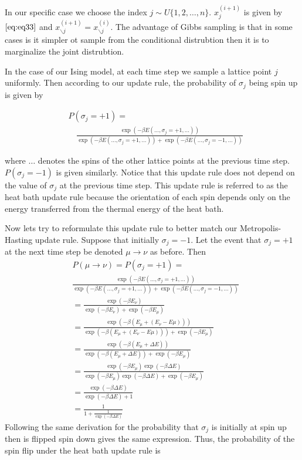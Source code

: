 \documentclass{article}
\begin{document}
In our specific case we choose the index $j \sim U\{1,2,\ldots, n\}$. $x_j^{(i+1)}$ is given by $\ref{eq:eq33}$ and 
$x_{\backslash j}^{(i+1)} = x_{\backslash j}^{(i)}$. The advantage of Gibbs sampling is that in some cases is it simpler ot sample from the conditional
distrubtion then it is to marginalize the joint distrubtion.

In the case of our Ising model, at each time step we sample a lattice point $j$ uniformly. Then according to our update rule, 
the probability of $\sigma_j$ being spin up is given by 

\begin{equation}
    \begin{split}
    &P(\sigma_j = +1) = \\
    &\quad \frac{\exp(-\beta E(\ldots, \sigma_j = +1, \ldots))}{\exp(-\beta E(\ldots, \sigma_j = +1, \ldots)) + \exp(-\beta E(\ldots, \sigma_j = -1, \ldots))}
    \end{split}
\end{equation}

where $\ldots$ denotes the spins of the other lattice points at the previous time step. $P(\sigma_j = -1)$ is given similarly. 
Notice that this update rule does not depend on the value of $\sigma_j$ at the previous time step. This update rule
is referred to as the heat bath update rule because the orientation of each spin depends only on the energy transferred from the thermal energy of the heat bath.

Now lets try to reformulate this update rule to better match our Metropolis-Hasting update rule. 
Suppose that initially $\sigma_j = -1$. Let the event that $\sigma_j = +1$ at the next time step be denoted $\mu \rightarrow \nu$ as before.
Then 
\begin{align}
    &P(\mu \rightarrow \nu) = P(\sigma_j = +1) = \\
    &\frac{\exp(-\beta E(\ldots, \sigma_j = +1, \ldots))}{\exp(-\beta E(\ldots, \sigma_j = +1, \ldots)) + \exp(-\beta E(\ldots, \sigma_j = -1, \ldots))} \\
    &= \frac{\exp(-\beta E_{\nu})}{\exp(-\beta E_{\nu}) + \exp(-\beta E_{\mu})} \\
    &= \frac{\exp(-\beta (E_{\mu} + (E_{\nu} - E{\mu})))}{\exp(-\beta (E_{\mu} + (E_{\nu} - E{\mu}))) + \exp(-\beta E_{\mu})} \\
    &= \frac{\exp(-\beta (E_{\mu} + \Delta E))}{\exp(-\beta (E_{\mu} + \Delta E)) + \exp(-\beta E_{\mu})} \\
    &= \frac{\exp(-\beta E_{\mu}) \exp(-\beta \Delta E)}{\exp(-\beta E_{\mu}) \exp(-\beta \Delta E) + \exp(-\beta E_{\mu})} \\
    &= \frac{\exp(-\beta \Delta E)}{\exp(-\beta \Delta E) + 1} \\
    &= \frac{1}{1 + \frac{1}{\exp(-\beta \Delta E)}}
\end{align}
Following the same derivation for the probability that $\sigma_j$ is initially at spin up then is flipped spin down gives the same expression.
Thus, the probability of the spin flip under the heat bath update rule is 
\end{document}
